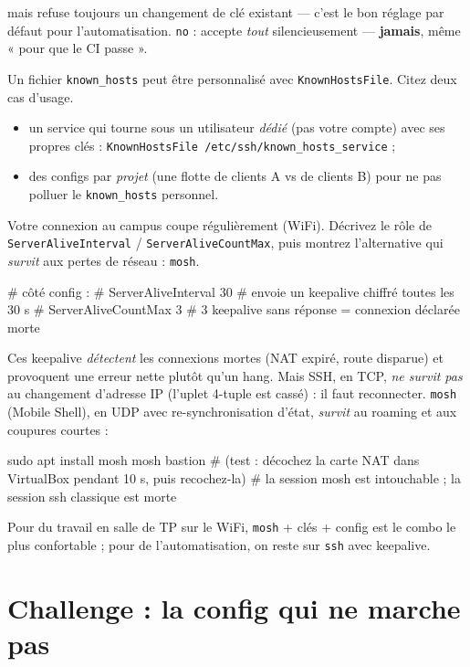\documentclass[a4paper,10pt]{exam}
\begin{document}
\begin{questions}
\begin{solution}
mais refuse toujours un changement de clé existant — c'est le bon réglage par défaut
pour l'automatisation. \texttt{no} : accepte \emph{tout} silencieusement —
\textbf{jamais}, même « pour que le CI passe ».
\end{solution}
\question Un fichier \texttt{known\_hosts} peut être personnalisé avec
\texttt{KnownHostsFile}. Citez deux cas d'usage.
\begin{solution}
\begin{itemize}
  \item un service qui tourne sous un utilisateur \emph{dédié} (pas votre compte) avec
        ses propres clés : \texttt{KnownHostsFile /etc/ssh/known\_hosts\_service} ;
  \item des configs par \emph{projet} (une flotte de clients A vs de clients B) pour ne
        pas polluer le \texttt{known\_hosts} personnel.
\end{itemize}
\end{solution}
\question Votre connexion au campus coupe régulièrement (WiFi). Décrivez le rôle de
\texttt{ServerAliveInterval} / \texttt{ServerAliveCountMax}, puis montrez l'alternative
qui \emph{survit} aux pertes de réseau : \texttt{mosh}.
\begin{solution}
\begin{bashcode}
# côté config :
#   ServerAliveInterval 30   # envoie un keepalive chiffré toutes les 30 s
#   ServerAliveCountMax 3    # 3 keepalive sans réponse = connexion déclarée morte
\end{bashcode}
Ces keepalive \emph{détectent} les connexions mortes (NAT expiré, route disparue) et
provoquent une erreur nette plutôt qu'un hang. Mais SSH, en TCP, \emph{ne survit pas} au
changement d'adresse IP (l'uplet 4-tuple est cassé) : il faut reconnecter.
\texttt{mosh} (Mobile Shell), en UDP avec re-synchronisation d'état, \emph{survit} au
roaming et aux coupures courtes :
\begin{bashcode}
sudo apt install mosh
mosh bastion
# (test : décochez la carte NAT dans VirtualBox pendant 10 s, puis recochez-la)
# la session mosh est intouchable ; la session ssh classique est morte
\end{bashcode}
Pour du travail en salle de TP sur le WiFi, \texttt{mosh} + clés + config est le
combo le plus confortable ; pour de l'automatisation, on reste sur \texttt{ssh} avec
keepalive.
\end{solution}
\end{questions}

\section{Challenge : la config qui ne marche pas}
\end{document}
